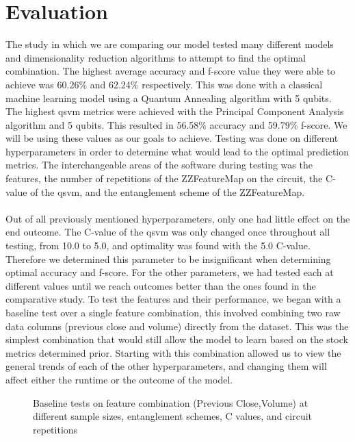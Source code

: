 \documentclass{article}
\begin{document}
\section{Evaluation}
The study in which we are comparing our model tested many different models and dimensionality reduction algorithms to attempt to find the optimal combination. The highest average accuracy and f-score value they were able to achieve was 60.26\% and 62.24\% respectively. This was done with a classical machine learning model using a Quantum Annealing algorithm with 5 qubits. The highest \gls{qsvm} metrics were achieved with the Principal Component Analysis algorithm and 5 qubits. This resulted in 56.58\% accuracy and 59.79\% f-score. We will be using these values as our goals to achieve. Testing was done on different hyperparameters in order to determine what would lead to the optimal prediction metrics. The interchangeable areas of the software during testing was the features, the number of repetitions of the ZZFeatureMap on the circuit, the C-value of the \gls{qsvm}, and the entanglement scheme of the ZZFeatureMap.
\\
\\
Out of all previously mentioned hyperparameters, only one had little effect on the end outcome. The C-value of the \gls{qsvm} was only changed once throughout all testing, from 10.0 to 5.0, and optimality was found with the 5.0 C-value. Therefore we determined this parameter to be insignificant when determining optimal accuracy and f-score. For the other parameters, we had tested each at different values until we reach outcomes better than the ones found in the comparative study. To test the features and their performance, we began with a baseline test over a single feature combination, this involved combining two raw data columns (previous close and volume) directly from the dataset. This was the simplest combination that would still allow the model to learn based on the stock metrics determined prior. Starting with this combination allowed us to view the general trends of each of the other hyperparameters, and changing them will affect either the runtime or the outcome of the model. 
\begin{figure}[H]
    \centering
    \caption{Baseline tests on feature combination (Previous Close,Volume) at different sample sizes, entanglement schemes, C values, and circuit repetitions}
    \label{fig:5}
\end{figure}
\end{document}
